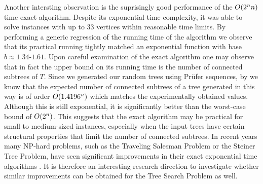 Another intersting observation is the suprisingly good performance of the $O\mathopen{}\left( 2^nn \right)$ time exact algorithm. Despite its exponential time complexity, it was able to solve instances with up to 33 vertices within reasonable time limits. By performing a generic regression of the running time of the algorithm we observe that its practical running tightly matched an exponential function with base $b\approx 1.34 $-$1.61$. Upon careful examination of the exact algorithm one may observe that in fact the upper bound on its running time is the number of connected subtrees of $T$. Since we generated our random trees using Prüfer sequences, by \cite{SubTsofRT} we know that the expected number of connected subtrees of a tree generated in this way is of order $O\mathopen{}\left( 1.4196^n \right)$ which matches the experimentally obtained values. Although this is still exponential, it is significantly better than the worst-case bound of $O\mathopen{}\left( 2^n \right)$. This suggests that the exact algorithm may be practical for small to medium-sized instances, especially when the input trees have certain structural properties that limit the number of connected subtrees. In recent years many NP-hard problems, such as the Traveling Salesman Problem or the Steiner Tree Problem, have seen significant improvements in their exact exponential time algorithms \cite{ExpTAlgs}. It is therefore an interesting research direction to investigate whether similar improvements can be obtained for the Tree Search Problem as well.

